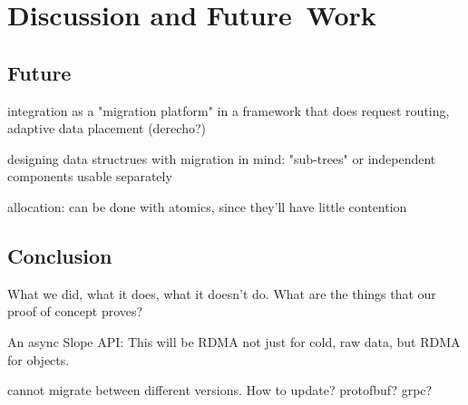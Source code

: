 \chapter{Discussion and Future~Work}
\label{chap:discussionfuture}


\section{Future}

integration as a "migration platform" in a framework that does request routing,
adaptive data placement (derecho?)

designing data structrues with migration in mind: "sub-trees" or independent
components usable separately

allocation: can be done with atomics, since they'll have little contention


\section{Conclusion}
What we did, what it does, \cite{kalia2016fasst} what it doesn't do. What are the things that our
proof of concept proves?

An async Slope API: This will be RDMA not just for cold, raw data, but RDMA for
objects.

cannot migrate between different versions. How to update? protofbuf? grpc?
